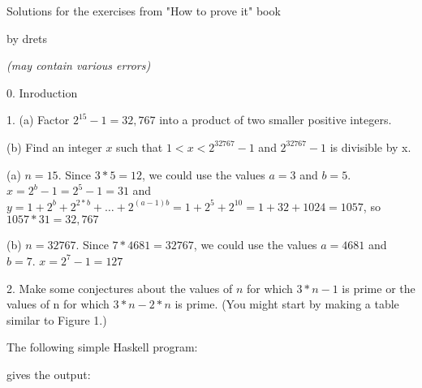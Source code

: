 \documentclass{article}
\begin{document}
\vspace*{\fill}
\centerline{\sc \large Solutions for the exercises from "How to prove it" book }
\centerline{by drets}
\centerline{\textit{(may contain various errors)}}
\vspace*{\fill}
%
\pagebreak
\centerline{\sc \large 0. Inroduction}
\vspace{50pt}

1. (a) Factor $2^{15} - 1 = 32,767$ into a product of two smaller positive integers.

\hspace{12pt}(b) Find an integer $x$ such that $1 < x < 2^{32767} − 1$ and $2^{32767} - 1$ is divisible by x.
\vspace{20pt}


(a) $n = 15$. Since $3 * 5 = 12$, we could use the values $a = 3$ and $b = 5$.
$x = 2^b - 1 = 2^5 - 1 = 31$ and $y = 1 + 2^b + 2^{2*b} + \dotso + 2^{(a-1)b} = 1 + 2^5 + 2^{10} = 1 + 32 + 1024 = 1057$,
so $1057 * 31 = 32,767$
\vspace{10pt}

(b) $n=32767$. Since $7 * 4681 = 32767$, we could use the values $a = 4681$ and $b = 7$.
$x = 2^7 - 1 = 127$
\vspace{40pt}

2. Make some conjectures about the values of $n$ for which $3*n - 1$ is prime or
the values of n for which $3*n - 2*n$ is prime. (You might start by making a
table similar to Figure 1.)
\vspace{20pt}

The following simple Haskell program:

gives the output:
\end{document}
